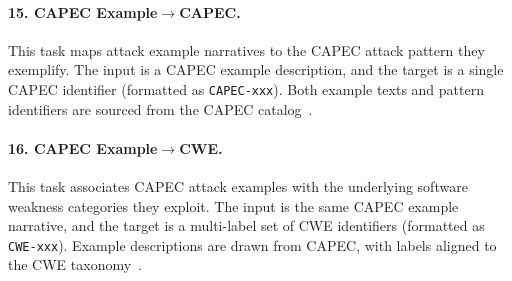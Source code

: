 \paragraph{15. CAPEC Example$\rightarrow$CAPEC.}
This task maps attack example narratives to the CAPEC attack pattern they exemplify. The input is a CAPEC example description, and the target is a single CAPEC identifier (formatted as \texttt{CAPEC-xxx}). Both example texts and pattern identifiers are sourced from the CAPEC catalog~\citep{capec}.

\paragraph{16. CAPEC Example$\rightarrow$CWE.}
This task associates CAPEC attack examples with the underlying software weakness categories they exploit. The input is the same CAPEC example narrative, and the target is a multi-label set of CWE identifiers (formatted as \texttt{CWE-xxx}). Example descriptions are drawn from CAPEC, with labels aligned to the CWE taxonomy~\citep{capec,cwe}.









